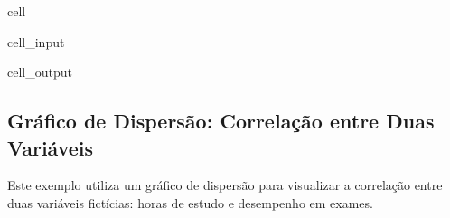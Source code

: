 \documentclass[letterpaper,10pt,english]{jupyterBook}
\begin{document}
\begin{sphinxuseclass}{cell}
\begin{sphinxVerbatimInput}
\begin{sphinxuseclass}{cell_input}
\begin{sphinxVerbatim}[commandchars=\\\{\}]
\end{sphinxVerbatim}

\end{sphinxuseclass}\end{sphinxVerbatimInput}
\begin{sphinxVerbatimOutput}

\begin{sphinxuseclass}{cell_output}
\noindent{}

\end{sphinxuseclass}\end{sphinxVerbatimOutput}

\end{sphinxuseclass}

\subsection{Gráfico de Dispersão: Correlação entre Duas Variáveis}
\label{\detokenize{chapters/ch7/ch7:grafico-de-dispersao-correlacao-entre-duas-variaveis}}
\sphinxAtStartPar
Este exemplo utiliza um gráfico de dispersão para visualizar a correlação entre duas variáveis fictícias: horas de estudo e desempenho em exames.
\end{document}
